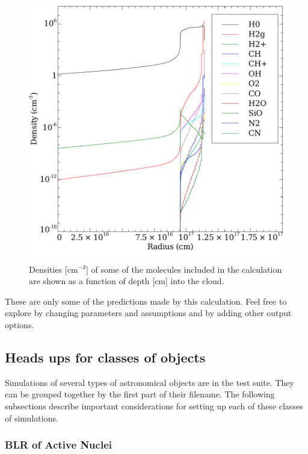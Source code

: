 \documentclass[12pt,twoside]{article}
\begin{document}
\begin{figure}
\begin{center}
\includegraphics[clip=on,width=\columnwidth,height=0.8\textheight,keepaspectratio]{molecule_structure}
\end{center}
\caption{Densities [cm$^{-3}$] of some of the molecules included in the calculation are shown as a function of depth [cm] into the cloud.}
\label{fig:molecule_structure}
\end{figure}

These are only some of the predictions made by this calculation.
Feel free to explore by changing parameters and assumptions and by adding
other output options.

\subsection{Heads ups for classes of objects}

Simulations of several types of astronomical objects are in the test
suite.  They can be grouped together by the first part of their filename.
The following subsections describe important considerations for setting
up each of these classes of simulations.

\subsubsection{BLR of Active Nuclei}
\end{document}
